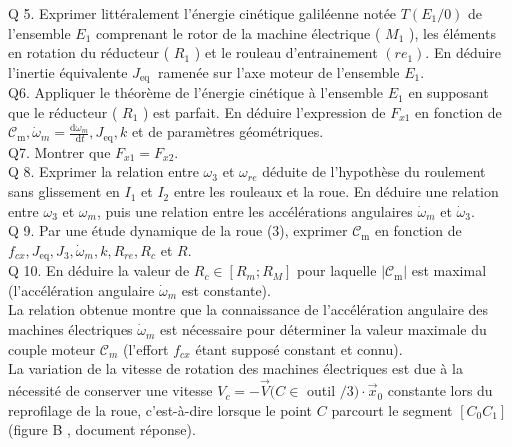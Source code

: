 \documentclass[10pt]{article}
\begin{document}
Q 5. Exprimer littéralement l'énergie cinétique galiléenne notée $T\left(E_{1} / 0\right)$ de l'ensemble $E_{1}$ comprenant le rotor de la machine électrique ( $M_{1}$ ), les éléments en rotation du réducteur ( $R_{1}$ ) et le rouleau d'entrainement $\left(r e_{1}\right)$. En déduire l'inertie équivalente $J_{\text {eq }}$ ramenée sur l'axe moteur de l'ensemble $E_{1}$.\\
Q6. Appliquer le théorème de l'énergie cinétique à l'ensemble $E_{1}$ en supposant que le réducteur ( $R_{1}$ ) est parfait. En déduire l'expression de $F_{x 1}$ en fonction de $\mathcal{C}_{\mathrm{m}}, \dot{\omega}_{m}=\frac{\mathrm{d} \omega_{m}}{\mathrm{~d} t}, J_{\mathrm{eq}}, k$ et de paramètres géométriques.\\
Q7. Montrer que $F_{x 1}=F_{x 2}$.\\
Q 8. Exprimer la relation entre $\omega_{3}$ et $\omega_{r e}$ déduite de l'hypothèse du roulement sans glissement en $I_{1}$ et $I_{2}$ entre les rouleaux et la roue. En déduire une relation entre $\omega_{3}$ et $\omega_{m}$, puis une relation entre les accélérations angulaires $\dot{\omega}_{m}$ et $\dot{\omega}_{3}$.\\
Q 9. Par une étude dynamique de la roue (3), exprimer $\mathcal{C}_{\mathrm{m}}$ en fonction de $f_{c x}, J_{\mathrm{eq}}, J_{3}, \dot{\omega}_{m}, k, R_{r e}, R_{c}$ et $R$.\\
Q 10. En déduire la valeur de $R_{c} \in\left[R_{m} ; R_{M}\right]$ pour laquelle $\left|\mathcal{C}_{\mathrm{m}}\right|$ est maximal (l'accélération angulaire $\dot{\omega}_{m}$ est constante).\\
La relation obtenue montre que la connaissance de l'accélération angulaire des machines électriques $\dot{\omega}_{m}$ est nécessaire pour déterminer la valeur maximale du couple moteur $\mathcal{C}_{m}$ (l'effort $f_{c x}$ étant supposé constant et connu).\\
La variation de la vitesse de rotation des machines électriques est due à la nécessité de conserver une vitesse $V_{c}=-\vec{V}(C \in$ outil $/ 3) \cdot \vec{x}_{0}$ constante lors du reprofilage de la roue, c'est-à-dire lorsque le point $C$ parcourt le segment $\left[C_{0} C_{1}\right]$ (figure B , document réponse).
\end{document}
